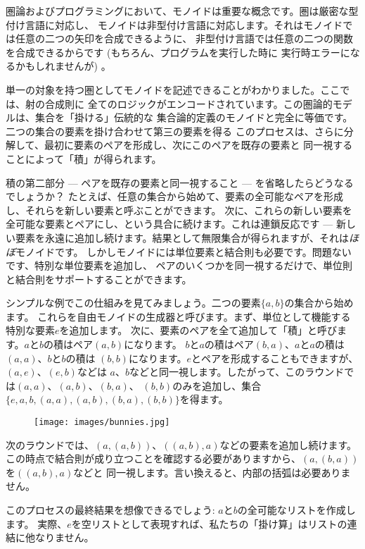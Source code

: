 
\lettrine[lhang=0.17]{圏}{論}およびプログラミングにおいて、モノイドは重要な概念です。圏は厳密な型付け言語に対応し、
モノイドは非型付け言語に対応します。それはモノイドでは任意の二つの矢印を合成できるように、
非型付け言語では任意の二つの関数を合成できるからです (もちろん、プログラムを実行した時に
実行時エラーになるかもしれませんが) 。

単一の対象を持つ圏としてモノイドを記述できることがわかりました。ここでは、射の合成則に
全てのロジックがエンコードされています。この圏論的モデルは、集合を「掛ける」伝統的な
集合論的定義のモノイドと完全に等価です。二つの集合の要素を掛け合わせて第三の要素を得る
このプロセスは、さらに分解して、最初に要素のペアを形成し、次にこのペアを既存の要素と
同一視することによって「積」が得られます。

積の第二部分  ---  ペアを既存の要素と同一視すること  ---  を省略したらどうなるでしょうか？
たとえば、任意の集合から始めて、要素の全可能なペアを形成し、それらを新しい要素と呼ぶことができます。
次に、これらの新しい要素を全可能な要素とペアにし、という具合に続けます。これは連鎖反応です  --- 
新しい要素を永遠に追加し続けます。結果として無限集合が得られますが、それは\emph{ほぼ}モノイドです。
しかしモノイドには単位要素と結合則も必要です。問題ないです、特別な単位要素を追加し、
ペアのいくつかを同一視するだけで、単位則と結合則をサポートすることができます。

シンプルな例でこの仕組みを見てみましょう。二つの要素$\{a, b\}$の集合から始めます。
これらを自由モノイドの生成器と呼びます。まず、単位として機能する特別な要素$e$を追加します。
次に、要素のペアを全て追加して「積」と呼びます。$a$と$b$の積はペア$(a, b)$になります。
$b$と$a$の積はペア$(b, a)$、$a$と$a$の積は$(a, a)$、$b$と$b$の積は
$(b, b)$になります。$e$とペアを形成することもできますが、$(a, e)$、$(e, b)$などは
$a$、$b$などと同一視します。したがって、このラウンドでは$(a, a)$、$(a, b)$、$(b, a)$、
$(b, b)$のみを追加し、集合$\{e, a, b, (a, a), (a, b), (b, a), (b, b)\}$を得ます。

\begin{figure}[H]
  \centering
  \texttt{[image: images/bunnies.jpg]}
\end{figure}

\noindent
次のラウンドでは、$(a, (a, b))$、$((a, b), a)$などの要素を追加し続けます。
この時点で結合則が成り立つことを確認する必要がありますから、$(a, (b, a))$を$((a, b), a)$などと
同一視します。言い換えると、内部の括弧は必要ありません。

このプロセスの最終結果を想像できるでしょう: $a$と$b$の全可能なリストを作成します。
実際、$e$を空リストとして表現すれば、私たちの「掛け算」はリストの連結に他なりません。

